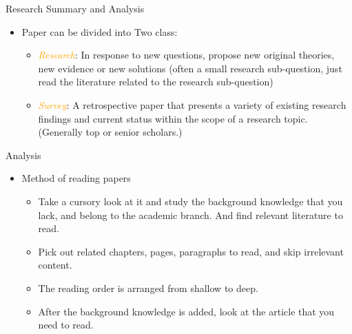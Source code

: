 \documentclass[
 size=14pt,
 paper=smartboard,  %
 mode=present, 		%
 display=slides, 	%
 style=tuliplab,  	%
 pauseslide,
 fleqn,leqno]{powerdot}{}
\begin{document}
\begin{slide}{Research Summary and Analysis}

\begin{itemize}
  \item Paper can be divided into Two class:
  \begin{itemize}
    \item  \textcolor{orange}{\textit{Research}}: In response to new questions, propose new original theories, new evidence or new solutions (often a small research sub-question, just read the literature related to the research sub-question)
    \item  \textcolor{orange}{\textit{Survey}}: A retrospective paper that presents a variety of existing research findings and current status within the scope of a research topic. (Generally top or senior scholars.)
  \end{itemize}
\end{itemize}
\end{slide}

\begin{slide}[toc=,bm=]{Analysis}

\begin{itemize}
    \item Method of reading papers
    \begin{itemize}
      \item Take a cursory look at it and study the background knowledge that you lack, and belong to the academic branch. And find relevant literature to read.
      \item  Pick out related chapters, pages, paragraphs to read, and skip irrelevant content.
      \item The reading order is arranged from shallow to deep.
      \item After the background knowledge is added, look at the article that you need to read.
    \end{itemize}
\end{itemize}
\end{slide}
\end{document}
